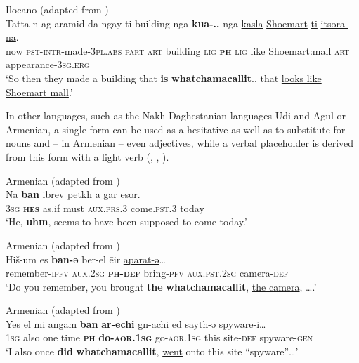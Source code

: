 \documentclass[output=paper]{langscibook}
\begin{document}
\ea\label{ex:intro:14}
{Ilocano (adapted from \citealt[658]{Rubino1996})}\\
\gll Tatta n-ag-aramid-da ngay ti building nga \textbf{kua-..} nga \uline{kasla} \uline{Shoemart} \uline{ti} \uline{itsora-na}.\\
     now \textsc{pst-intr}-made-3\textsc{pl.abs}  \textsc{part}   \textsc{art} building \textsc{lig} \textbf{\textsc{ph}} \textsc{lig} like Shoemart:mall \textsc{art} appearance-3\textsc{sg.erg}\\
\glt ‘So then they made a building that \textbf{is} \textbf{whatchamacallit}.. that \uline{looks like Shoemart mall}.’
\z

In other languages, such as the Nakh-Daghestanian languages Udi and Agul or Armenian, a single form can be used as a hesitative  as well as to substitute for nouns  and – in Armenian – even adjectives, while a verbal placeholder is derived from this form with a light verb  (\citealt[81]{Khurshudyan2006}, \citealt{KhurshudyanPodlesskaya2006}, \citealt{Ganenkov2010}).

\ea\label{ex:intro:15}
{Armenian (adapted from \citealt[7]{KhurshudyanPodlesskaya2006})}\\
\gll Na \textbf{ban} ibrev petkh a gar ēsor.\\
     \textsc{3sg} \textbf{\textsc{hes}} as.if must \textsc{aux.prs.3} come.\textsc{pst.}3 today \\
\glt ‘He, \textbf{uhm}, seems to have been supposed to come today.’
\z

\ea\label{ex:intro:16}
{Armenian (adapted from \citealt[9]{KhurshudyanPodlesskaya2006})}\\
\gll Hiš-um es \textbf{ban-ə} ber-el ēir \uline{aparat-ə}…\\
     remember-\textsc{ipfv} \textsc{aux.2sg} \textbf{\textsc{ph-def}} bring-\textsc{pfv} \textsc{aux.pst.2sg} camera-\textsc{def}\\
\glt ‘Do you remember, you brought \textbf{the} \textbf{whatchamacallit}, \uline{the camera}, ….’
\z

\ea\label{ex:intro:17}
{Armenian (adapted from \citealt[13]{KhurshudyanPodlesskaya2006})}\\
\gll Yes ēl mi angam \textbf{ban} \textbf{ar-echi} \uline{gn-achi} ēd sayth-ə spyware-i…\\
     \textsc{1sg} also one time \textbf{\textsc{ph}} \textbf{do-\textsc{aor.1sg}} go-\textsc{aor.1sg} this site-\textsc{def} spyware-\textsc{gen}\\
\glt ‘I also once \textbf{did} \textbf{whatchamacallit}, \uline{went} onto this site “spyware”…’
\z
\end{document}
